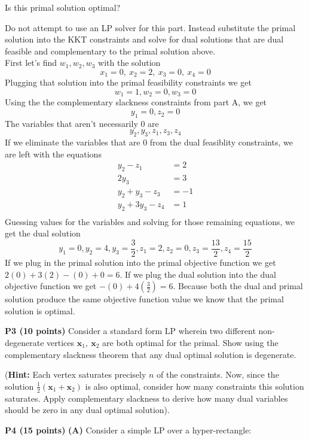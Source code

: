 \documentclass[11pt]{article}
\newcommand\vx {\mathbf{x}}
\begin{document}
Is this primal solution optimal? 

Do not attempt to use an LP solver for this part. Instead substitute
the primal solution into the KKT constraints and solve for dual
solutions that are dual feasible and complementary to the primal
solution above.
\\
First let's find $w_1, w_2, w_3$ with the solution 
\[ x_1 = 0,\ x_2 = 2,\ x_3 = 0,\ x_4 = 0 \]
Plugging that solution into the primal feasibility constraints we get
\[w_1 = 1, w_2 = 0, w_3 = 0\]
Using the the complementary slackness constraints from part A, we get
\[y_1 = 0, z_2 = 0\]
The variables that aren't necessarily 0 are
\[y_2, y_3, z_1, z_3, z_4\]
If we eliminate the variables that are 0 from the dual feasiblity constraints, we are left with the equations
\begin{align*}
y_2 - z_1 &= 2 \\
2y_3 &= 3 \\
y_2 + y_3 - z_3 &= -1 \\
y_2 + 3y_3 - z_4 &= 1 \\
\end{align*}
Guessing values for the variables and solving for those remaining equations, we get the dual solution
\[y_1 = 0, y_2 = 4, y_3 = \frac{3}{2}, z_1 = 2, z_2 = 0, z_3 = \frac{13}{2}, z_4 = \frac{15}{2}\]
If we plug in the primal solution into the primal objective function we get 
$2(0) + 3(2) - (0) + 0 = 6$.  If we plug the dual solution into the dual objective function we get $-(0) + 4(\frac{3}{2}) = 6$.  Because both the dual and primal solution produce the same objective function value we know that the primal solution is optimal.

\bigskip

\noindent\textbf{P3 (10 points)} Consider a standard form LP wherein
two different non-degenerate vertices $\vx_1,\ \vx_2$ are both optimal for the primal. Show using the
complementary slackness theorem that any dual optimal solution
is degenerate.

(\textbf{Hint:} Each vertex saturates precisely $n$ of the
constraints. Now, since the solution $\frac{1}{2} (\vx_1 + \vx_2)$
is also optimal, consider how many constraints this solution
saturates. Apply complementary slackness to derive how many
dual variables should be zero in any dual optimal solution).

\bigskip

\noindent\textbf{P4 (15 points)} \noindent\textbf{(A)} Consider a
simple LP over a hyper-rectangle:
\end{document}
